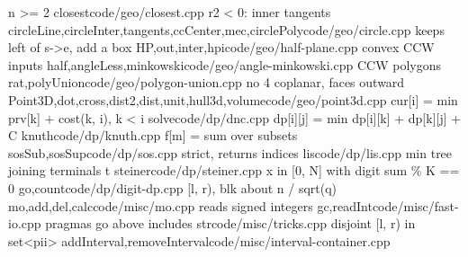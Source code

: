   {n >= 2}
  {closest}{code/geo/closest.cpp}
  {r2 < 0: inner tangents}
  {circleLine,circleInter,tangents,ccCenter,mec,circlePoly}{code/geo/circle.cpp}
  {keeps left of s->e, add a box}
  {HP,out,inter,hpi}{code/geo/half-plane.cpp}
  {convex CCW inputs}
  {half,angleLess,minkowski}{code/geo/angle-minkowski.cpp}
  {CCW polygons}
  {rat,polyUnion}{code/geo/polygon-union.cpp}
  {no 4 coplanar, faces outward}
  {Point3D,dot,cross,dist2,dist,unit,hull3d,volume}{code/geo/point3d.cpp}
  {cur[i] = min prv[k] + cost(k, i), k < i}
  {solve}{code/dp/dnc.cpp}
  {dp[i][j] = min dp[i][k] + dp[k][j] + C}
  {knuth}{code/dp/knuth.cpp}
  {f[m] = sum over subsets}
  {sosSub,sosSup}{code/dp/sos.cpp}
  {strict, returns indices}
  {lis}{code/dp/lis.cpp}
  {min tree joining terminals t}
  {steiner}{code/dp/steiner.cpp}
  {x in [0, N] with digit sum \% K == 0}
  {go,count}{code/dp/digit-dp.cpp}
  {[l, r), blk about n / sqrt(q)}
  {mo,add,del,calc}{code/misc/mo.cpp}
  {reads signed integers}
  {gc,readInt}{code/misc/fast-io.cpp}
  {pragmas go above includes}
  {str}{code/misc/tricks.cpp}
  {disjoint [l, r) in set<pii>}
  {addInterval,removeInterval}{code/misc/interval-container.cpp}

